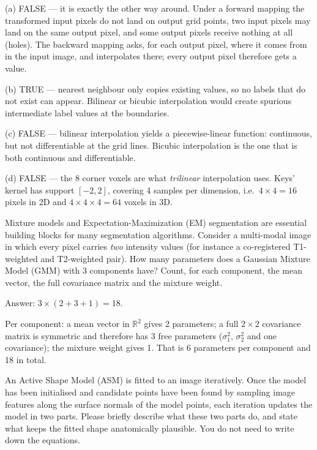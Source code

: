 \documentclass[11pt]{exam}
\newcommand{\answerspace}[1]{\ifprintanswers\else\vspace{#1}\fi}
\begin{document}
\begin{questions}
\begin{solution}
  (a) FALSE --- it is exactly the other way around. Under a forward mapping the transformed
  input pixels do not land on output grid points, two input pixels may land on the same output
  pixel, and some output pixels receive nothing at all (holes). The backward mapping asks, for
  each output pixel, where it comes from in the input image, and interpolates there; every
  output pixel therefore gets a value.

  (b) TRUE --- nearest neighbour only copies existing values, so no labels that do not exist can
  appear. Bilinear or bicubic interpolation would create spurious intermediate label values at
  the boundaries.

  (c) FALSE --- bilinear interpolation yields a piecewise-linear function: continuous, but not
  differentiable at the grid lines. Bicubic interpolation is the one that is both continuous and
  differentiable.

  (d) FALSE --- the 8 corner voxels are what \emph{trilinear} interpolation uses. Keys' kernel
  has support $[-2,2]$, covering 4 samples per dimension, i.e.\ $4\times4 = 16$ pixels in 2D and
  $4\times4\times4 = 64$ voxels in 3D.
\end{solution}

\question
Mixture models and Expectation-Maximization (EM) segmentation are essential building blocks for
many segmentation algorithms. Consider a multi-modal image in which every pixel carries
\emph{two} intensity values (for instance a co-registered T1-weighted and T2-weighted pair). How
many parameters does a Gaussian Mixture Model (GMM) with 3 components have? Count, for each
component, the mean vector, the full covariance matrix and the mixture weight.

\begin{solution}
  Answer: $3 \times (2 + 3 + 1) = 18$.

  Per component: a mean vector in $\mathbb{R}^2$ gives 2 parameters; a full $2\times2$ covariance
  matrix is symmetric and therefore has 3 free parameters ($\sigma_1^2$, $\sigma_2^2$ and one
  covariance); the mixture weight gives 1. That is 6 parameters per component and 18 in total.
\end{solution}
\answerspace{3.0cm}

\question
An Active Shape Model (ASM) is fitted to an image iteratively. Once the model has been
initialised and candidate points have been found by sampling image features along the surface
normals of the model points, each iteration updates the model in two parts. Please briefly
describe what these two parts do, and state what keeps the fitted shape anatomically plausible.
You do not need to write down the equations.


\end{questions}
\end{document}
